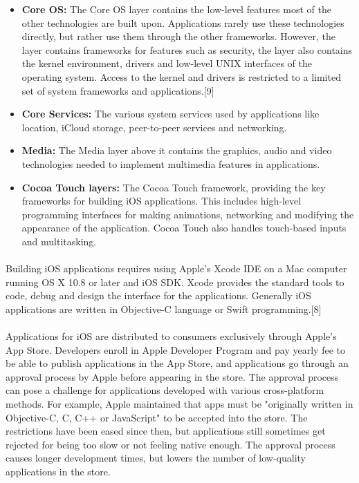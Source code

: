 \begin{itemize}


 \item \textbf{Core OS:} The Core OS layer contains the low-level features most of the other technologies are built upon.
 Applications rarely use these technologies directly, but rather use them through the other frameworks.
 However, the layer contains frameworks for features such as security, the layer also contains the kernel environment, drivers and low-level UNIX interfaces of the operating system.
 Access to the kernel and drivers is restricted to a limited set of system frameworks and applications.[9]

 \item \textbf{Core Services:} The various system services used by applications like location,
 iCloud storage, peer-to-peer services and networking.
\item \textbf{Media:} The Media layer above it contains the graphics, audio and video technologies needed to implement
  multimedia features in applications.
\item \textbf{Cocoa Touch layers:} The Cocoa Touch framework, providing the key frameworks for building iOS
  applications. This includes high-level programming interfaces for making
  animations, networking and modifying the appearance of the application.
  Cocoa Touch also handles touch-based inputs and multitasking.

\end{itemize}


\paragraph{}
Building iOS applications requires using Apple's Xcode IDE on a Mac computer running OS X 10.8 or later and iOS SDK.
 Xcode provides the standard tools to code, debug and design the interface for the applications. Generally iOS applications are written in Objective-C language or Swift programming.[8]

\paragraph{}
Applications for iOS are distributed to consumers exclusively through Apple's App Store.
Developers enroll in Apple Developer Program and pay yearly fee to be able to publish applications in the App Store, and applications
go through an approval process by Apple before appearing in the store. The approval process can pose a challenge for applications developed with various cross-platform
methods. For example, Apple maintained that apps must be "originally written in Objective-C, C, C++ or JavaScript" to be accepted into the store.
The restrictions have been eased since then, but applications still sometimes get rejected for being too slow or not feeling native enough.
The approval process causes longer development times, but lowers the number of low-quality applications in the store.

